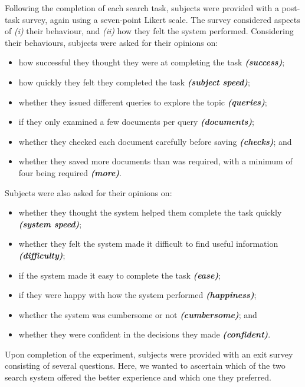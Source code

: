 Following the completion of each search task, subjects were provided with a post-task survey, again using a seven-point Likert scale. The survey considered aspects of \emph{(i)} their behaviour, and \emph{(ii)} how they felt the system performed. Considering their behaviours, subjects were asked for their opinions on:
\begin{itemize}
\item how successful they thought they were at completing the task \emph{\textbf{(success)}}; 
\item how quickly they felt they completed the task \emph{\textbf{(subject speed)}}; 
\item whether they issued different queries to explore the topic \emph{\textbf{(queries)}}; 
\item if they only examined a few documents per query \emph{\textbf{(documents)}}; 
\item whether they checked each document carefully before saving \emph{\textbf{(checks)}}; and 
\item whether they saved more documents than was required, with a minimum of four being required \emph{\textbf{(more)}}. 
\end{itemize}
Subjects were also asked for their opinions on: 
\begin{itemize}
\item whether they thought the system helped them complete the task quickly \emph{\textbf{(system speed)}}; 
\item whether they felt the system made it difficult to find useful information \emph{\textbf{(difficulty)}}; 
\item if the system made it easy to complete the task \emph{\textbf{(ease)}}; 
\item if they were happy with how the system performed \emph{\textbf{(happiness)}}; 
\item whether the system was cumbersome or not \emph{\textbf{(cumbersome)}}; and 
\item whether they were confident in the decisions they made \emph{\textbf{(confident)}}. 
\end{itemize}
Upon completion of the experiment, subjects were provided with an exit survey consisting of several questions. Here, we wanted to ascertain which of the two search system offered the better experience and which one they preferred. 


